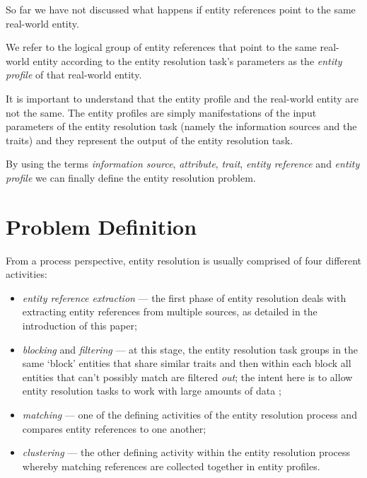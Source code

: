 \documentclass[11pt]{article}
\begin{document}
    So far we have not discussed what happens if entity references point to the
    same real-world entity.
    
    \begin{defn}
        We refer to the logical group of entity references that point to
        the same real-world entity according to the entity resolution task's
        parameters as the \textit{entity profile} of that real-world entity.
    \end{defn}

    It is important to understand that the entity profile and the real-world
    entity are not the same.
    The entity profiles are simply manifestations of the input parameters of the
    entity resolution task (namely the information sources and the traits) and
    they represent the output of the entity resolution task.
    
    By using the terms \textit{information source}, \textit{attribute},
    \textit{trait}, \textit{entity reference} and \textit{entity profile} we can
    finally define the entity resolution problem.

    \section{Problem Definition}\label{sec:problem}

    From a process perspective, entity resolution is usually comprised of four
    different activities\cite{Pap19,Tal11}:
    \begin{itemize}
        \item \textit{entity reference extraction} --- the first phase of entity
        resolution deals with extracting entity references from multiple
        sources, as detailed in the introduction of this paper;
        \item \textit{blocking} and \textit{filtering} --- at this stage, the
        entity resolution task groups in the same `block' entities that share
        similar traits and then within each block all entities that can't
        possibly match are filtered \textit{out}; the intent here is to allow
        entity resolution tasks to work with large amounts of data \cite{Pap19};
        \item \textit{matching} --- one of the defining activities of the entity
        resolution process and compares entity references to one another;
        \item \textit{clustering} --- the other defining activity within the
        entity resolution process whereby matching references are collected
        together in entity profiles.
    \end{itemize}
\end{document}

